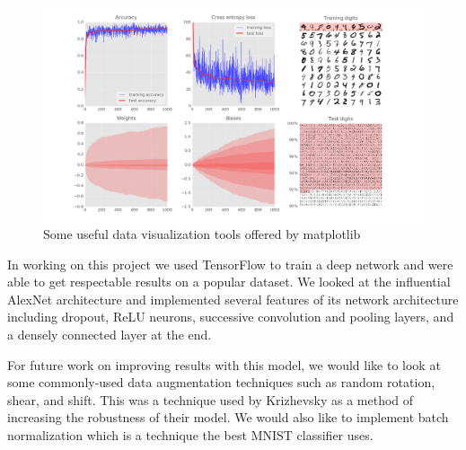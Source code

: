 \documentclass{article}
\begin{document}
\begin{figure}[h]
	\centering
	\includegraphics[width=\textwidth]{matplotlib.png}
    \caption{Some useful data visualization tools offered by matplotlib}
    \label{fig:matplotlib}
\end{figure}

In working on this project we used TensorFlow to train a deep network and were able to get respectable results on a popular dataset. We looked at the influential AlexNet architecture and implemented several features of its network architecture including dropout, ReLU neurons, successive convolution and pooling layers, and a densely connected layer at the end. 

For future work on improving results with this model, we would like to look at some commonly-used data augmentation techniques such as random rotation, shear, and shift. This was a technique used by Krizhevsky as a method of increasing the robustness of their model. We would also like to implement batch normalization which is a technique the best MNIST classifier uses. 



\end{document}
